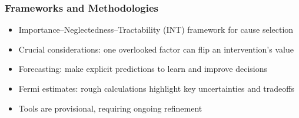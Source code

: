 	



\begin{frame}[fragile]\frametitle{Frameworks and Methodologies}
      \begin{itemize}
        \item Importance–Neglectedness–Tractability (INT) framework for cause selection
        \item Crucial considerations: one overlooked factor can flip an intervention’s value
        \item Forecasting: make explicit predictions to learn and improve decisions
        \item Fermi estimates: rough calculations highlight key uncertainties and tradeoffs
        \item Tools are provisional, requiring ongoing refinement
      \end{itemize}
\end{frame}

